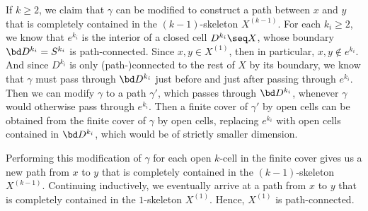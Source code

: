 \documentclass[12pt]{article}
\begin{document}
    If $k \geq 2$, we claim that $\gamma$ can be modified to construct a path between $x$ and $y$ that is completely contained in the $(k-1)$-skeleton $X^{(k-1)}$.
    For each $k_i \geq 2$, we know that $e^{k_i}$ is the interior of a closed cell $D^{k_i} \seq X$, whose boundary $\bd D^{k_i} = S^{k_i}$ is path-connected.
    Since $x, y \in X^{(1)}$, then in particular, $x, y \notin e^{k_i}$.
    And since $D^{k_i}$ is only (path-)connected to the rest of $X$ by its boundary, we know that $\gamma$ must pass through $\bd D^{k_i}$ just before and just after passing through $e^{k_i}$.
    Then we can modify $\gamma$ to a path $\gamma'$, which passes through $\bd D^{k_i}$, whenever $\gamma$ would otherwise pass through $e^{k_i}$.
    Then a finite cover of $\gamma'$ by open cells can be obtained from the finite cover of $\gamma$ by open cells, replacing $e^{k_i}$ with open cells contained in $\bd D^{k_i}$, which would be of strictly smaller dimension.

    Performing this modification of $\gamma$ for each open $k$-cell in the finite cover gives us a new path from $x$ to $y$ that is completely contained in the $(k-1)$-skeleton $X^{(k-1)}$.
    Continuing inductively, we eventually arrive at a path from $x$ to $y$ that is completely contained in the $1$-skeleton $X^{(1)}$.
    Hence, $X^{(1)}$ is path-connected.
\end{document}
